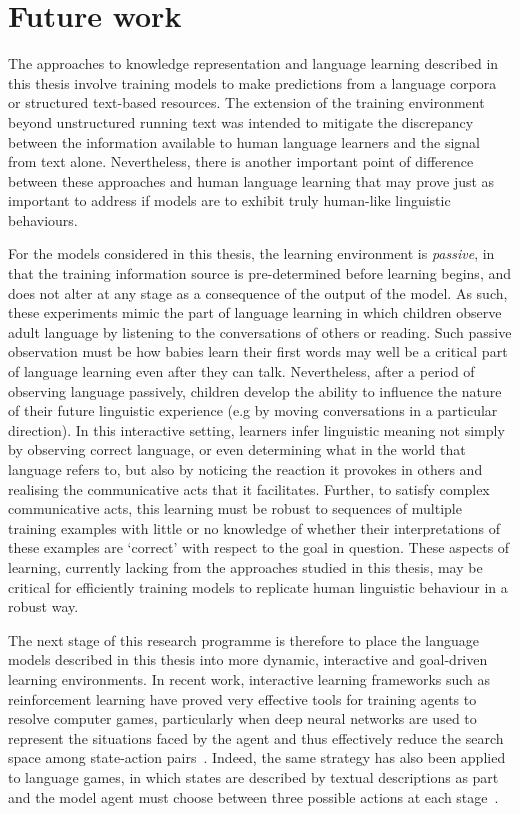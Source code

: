 \section{Future work} The approaches to knowledge representation and language learning described in this thesis involve training models to make predictions from a language corpora or structured text-based resources. The extension of the training environment beyond unstructured running text was intended to mitigate the discrepancy between the information available to human language learners and the signal from text alone. Nevertheless, there is another important point of difference between these approaches and human language learning that may prove just as important to address if models are to exhibit truly human-like linguistic behaviours. 

For the models considered in this thesis, the learning environment is \emph{passive}, in that the training information source is pre-determined before learning begins, and does not alter at any stage as a consequence of the output of the model. As such, these experiments mimic the part of language learning in which children observe adult language by listening to the conversations of others or reading. Such passive observation must be how babies learn their first words may well be a critical part of language learning even after they can talk. Nevertheless, after a period of observing language passively, children develop the ability to influence the nature of their future linguistic experience (e.g by moving conversations in a particular direction). In this interactive setting, learners infer linguistic meaning not simply by observing correct language, or even determining what in the world that language refers to, but also by noticing the reaction it provokes in others and realising the communicative acts that it facilitates. Further, to satisfy complex communicative acts, this learning must be robust to sequences of multiple training examples with little or no knowledge of whether their interpretations of these examples are `correct' with respect to the goal in question. These aspects of learning, currently lacking from the approaches studied in this thesis, may be critical for efficiently training models to replicate human linguistic behaviour in a robust way.

The next stage of this research programme is therefore to place the language models described in this thesis into more dynamic, interactive and goal-driven learning environments. In recent work, interactive learning frameworks such as reinforcement learning have proved very effective tools for training agents to resolve computer games, particularly when deep neural networks are used to represent the situations faced by the agent and thus effectively reduce the search space among state-action pairs~\citep{mnih2015human}. Indeed, the same strategy has also been applied to language games, in which states are described by textual descriptions as part and the model agent must choose between three possible actions at each stage~\citep{narasimhan2015language}. 

